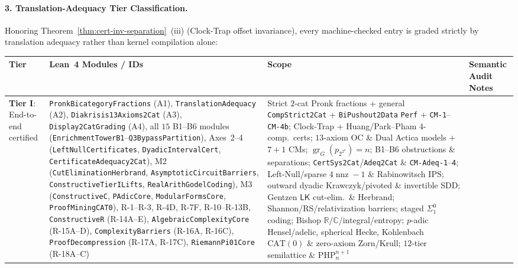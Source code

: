 \documentclass[11pt]{article}
\theoremstyle{plain}
\theoremstyle{definition}
\newcommand{\gr}{\operatorname{gr}}
\begin{document}
\paragraph{3. Translation-Adequacy Tier Classification.}
Honoring Theorem~\ref{thm:cert-inv-separation}~(iii) (Clock-Trap offset invariance), every machine-checked entry is graded strictly by translation adequacy rather than kernel compilation alone:
\begin{center}\footnotesize
\begin{tabular}{@{} >{\raggedright\arraybackslash}p{2.2cm} >{\raggedright\arraybackslash}p{4.0cm} >{\raggedright\arraybackslash}p{3.9cm} >{\raggedright\arraybackslash}p{3.9cm} @{}}
\toprule
Tier & Lean~4 Modules / IDs & Scope & Semantic Audit Notes \\ \midrule
\textbf{Tier I}: End-to-end certified &
\texttt{PronkBicategory\allowbreak Fractions} (A1), \texttt{Translation\allowbreak Adequacy} (A2), \texttt{Diakrisis13\allowbreak Axioms2Cat} (A3), \texttt{Display2Cat\allowbreak Grading} (A4), all $15$ B1--B6 modules (\texttt{EnrichmentTowerB1}--\texttt{Q3BypassPartition}), Axes~2--4 (\texttt{LeftNull\allowbreak Certificates}, \texttt{DyadicIntervalCert}, \texttt{Certificate\allowbreak Adequacy2Cat}), M2 (\texttt{CutElimination\allowbreak Herbrand}, \texttt{Asymptotic\allowbreak CircuitBarriers}, \texttt{Constructive\allowbreak TierILifts}, \texttt{RealArith\allowbreak GodelCoding}), M3 (\texttt{ConstructiveC}, \texttt{PAdicCore}, \texttt{ModularFormsCore}, \texttt{ProofMiningCAT0}), R-1--R-3, R-4D, R-7F, R-10--R-13B, \texttt{ConstructiveR} (R-14A--E), \texttt{Algebraic\allowbreak ComplexityCore} (R-15A--D), \texttt{ComplexityBarriers} (R-16A, R-16C), \texttt{ProofDecompression} (R-17A, R-17C), \texttt{RiemannPi01Core} (R-18A--C) &
Strict $2$-cat Pronk fractions + general \texttt{CompStrict2Cat} + \texttt{BiPushout2Data} \texttt{Perf} + \texttt{CM-1}--\texttt{CM-4b}; Clock-Trap + Huang/Park--Pham $4$-comp.\ certs; $13$-axiom OC \& Dual Actica models + $7+1$ CMs; $\gr_G(p_{2^{2^n}})=n$; B1--B6 obstructions \& separations; \texttt{CertSys2Cat}/\texttt{Adeq2Cat} \& \texttt{CM-Adeq-1}--\texttt{4}; Left-Null/sparse $4\operatorname{nnz}-1$ \& Rabinowitsch $\mathrm{IPS}$; outward dyadic Krawczyk/pivoted \& invertible SDD; Gentzen $\mathsf{LK}$ cut-elim.\ \& Herbrand; Shannon/RS/relativization barriers; staged $\Sigma^0_1$ coding; Bishop $\mathbb{R}/\mathbb{C}$/integral/entropy; $p$-adic Hensel/adelic, spherical Hecke, Kohlenbach $\mathrm{CAT}(0)$ \& zero-axiom Zorn/Krull; $12$-tier semilattice \& $\mathrm{PHP}_n^{n+1}$ &

\end{tabular}
\end{center}
\end{document}
